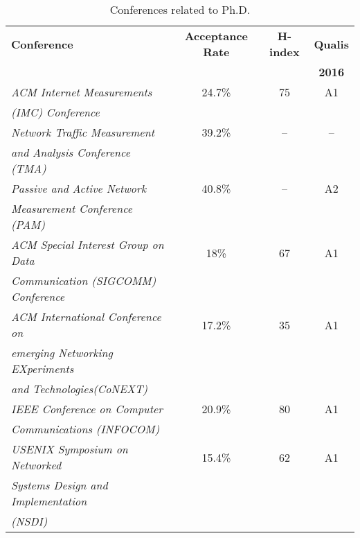 	\begin{table}[htp]
	\centering
	\begin{tabularx}{\textwidth}{ l | c | c | c }
	\hline
	{\bf Conference} & {\bf Acceptance Rate} & \textbf{H-index} & \textbf{Qualis}      \\ 
	                          							  &  &  & \textbf{2016}        \\ \hline
	\textit{ACM Internet Measurements}                    &  24.7\% & 75 & A1          \\ 
	\textit{(IMC) Conference}   						  &         &    &             \\ \hline
	\textit{Network Traffic Measurement}                  &  39.2\% & -- & --          \\
	\textit{ and Analysis Conference (TMA)}               &         &    &             \\ \hline
	\textit{Passive and Active Network}                   &  40.8\% & -- & A2          \\
	\textit{ Measurement Conference (PAM)}                &         &    &             \\ \hline
	\textit{ACM Special Interest Group on Data}           &  18\%   & 67 & A1          \\
	\textit{Communication (SIGCOMM) Conference}           &         &    &             \\ \hline
	\textit{ACM International Conference on}              &  17.2\% & 35 & A1          \\
	\textit{emerging Networking EXperiments}	          &         &    &             \\
	\textit{and Technologies(CoNEXT)}                     &         &    &             \\ \hline
	\textit{IEEE Conference on Computer}                  &  20.9\% & 80 & A1          \\
	\textit{Communications (INFOCOM)}                     &         &    &             \\ \hline
	\textit{USENIX Symposium on Networked}                &  15.4\% & 62 & A1          \\
	\textit{Systems Design and Implementation}            &         &    &             \\
	\textit{(NSDI)}             				          &         &    &             \\ \hline

	\hline
	\end{tabularx}
	\caption{Conferences related to Ph.D.}
	\label{tbl:conferences}
	\end{table}